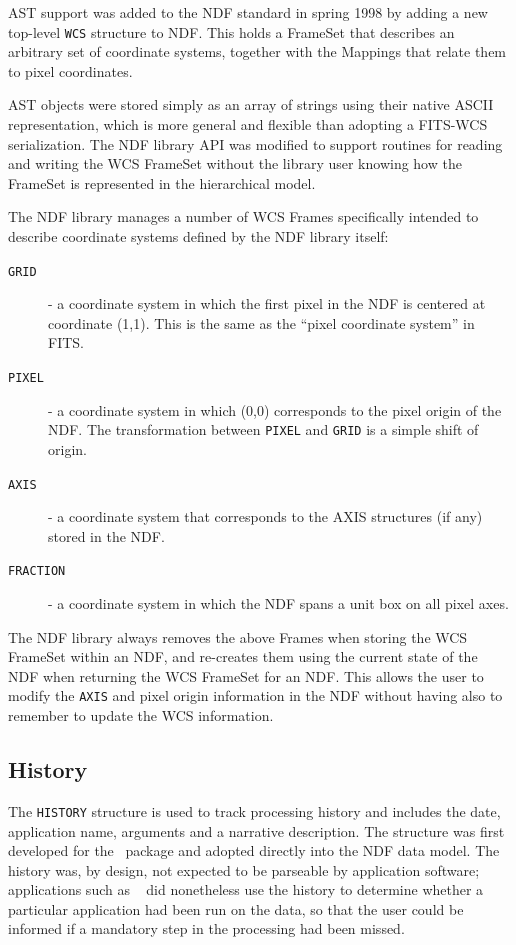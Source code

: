 \documentclass[final,authoryear,5p,times,twocolumn]{elsarticle}
\begin{document}
AST support was added to the NDF standard in spring 1998
\citep{2001ASPC..238..129B} by adding a new top-level \texttt{WCS} structure
to NDF. This holds a FrameSet that describes an arbitrary set of coordinate
systems, together with the Mappings that relate them to pixel coordinates.

AST objects were stored simply as an array of strings using their native
ASCII representation, which is more general and flexible
than adopting a FITS-WCS serialization. The NDF library API was modified
to support routines for reading and writing the WCS FrameSet without the
library user knowing how the FrameSet is represented in the hierarchical
model.

The NDF library manages a number of WCS Frames specifically intended to
describe coordinate systems defined by the NDF library itself:

\begin{description}
\item[\texttt{GRID}] - a coordinate system in which the first pixel in the NDF
is centered at coordinate (1,1). This is the same as the ``pixel coordinate
system'' in FITS.
\item[\texttt{PIXEL}] - a coordinate system in which (0,0) corresponds to
the pixel origin of the NDF. The transformation between \texttt{PIXEL}
and \texttt{GRID} is a simple shift of origin.
\item[\texttt{AXIS}] - a coordinate system that corresponds to the AXIS
structures (if any) stored in the NDF.
\item[\texttt{FRACTION}] - a coordinate system in which the NDF spans a
unit box on all pixel axes.
\end{description}

The NDF library always removes the above Frames when storing the
WCS FrameSet within an NDF, and re-creates them using the current state
of the NDF when returning the WCS FrameSet for an NDF. This allows the
user to modify the \texttt{AXIS} and pixel origin information in the
NDF without having also to remember to update the WCS information.

\subsection{History}

The \texttt{HISTORY} structure is used to track processing history and
includes the date, application name, arguments and a narrative
description. The structure was first developed for the
\asterix\ package and adopted directly into the NDF data
model. The history was, by design, not expected to be parseable by
application software; applications such as \surf\
\citep[][]{1998ASPC..145..216J} did nonetheless use the history to determine whether a
particular application had been run on the data, so that the user could be
informed if a mandatory step in the processing had been missed.
\end{document}
